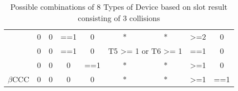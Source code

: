 \documentclass[fleqn]{article}
\begin{document}
\begin {table} [h]
\begin{tabular}{|c|c|c|c|c|c|c|c|c|}
                             & 0                               & 0                               & ==1              & 0   & *                                & *                               & \textgreater{}=2 & 0   \\ \cline{2-9} 
                             & 0                               & 0                               & ==1              & 0   & \multicolumn{2}{c|}{T5 \textgreater{}= 1 or T6  \textgreater{}= 1} & ==1              & 0   \\ \cline{2-9} 
                             & 0                               & 0                               & 0                & ==1 & *                                & *                               & \textgreater{}=1 & 0   \\ \hline
$\beta$CCC                   & 0                               & 0                               & 0                & 0   & *                                & *                               & \textgreater{}=1 & ==1 \\ \hline
\end{tabular}

\caption{Possible combinations of 8 Types of Device based on slot result consisting of 3 collisions}
\label{Tab8_3C}
\end{table}
\end{document}
